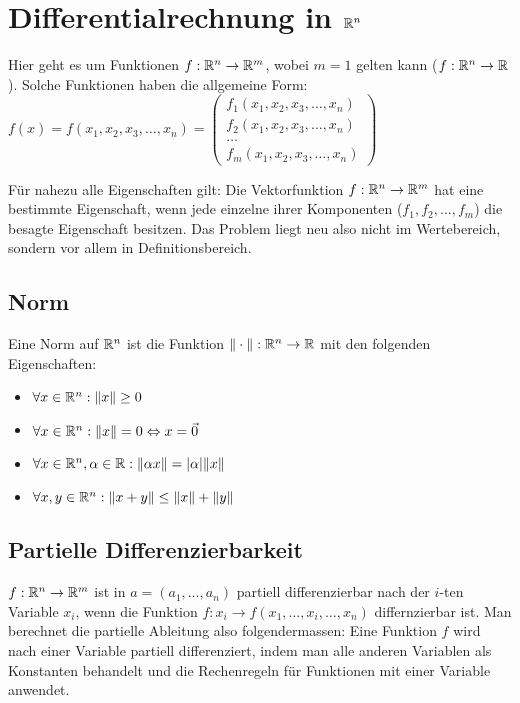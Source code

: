 \section{Differentialrechnung in $\mathbb{R}^n$}
Hier geht es um Funktionen $f: \mathbb{R}^n \to \mathbb{R}^m$, wobei $m=1$ gelten kann
($f: \mathbb{R}^n \to \mathbb{R}$). Solche Funktionen haben die allgemeine Form:
$f(x) = f(x_1, x_2, x_3, \ldots, x_n) = \begin{pmatrix}
f_1(x_1, x_2, x_3, \ldots, x_n)\\
f_2(x_1, x_2, x_3, \ldots, x_n)\\
\ldots\\
f_m(x_1, x_2, x_3, \ldots, x_n)
\end{pmatrix}$

Für nahezu alle Eigenschaften gilt: Die Vektorfunktion $f: \mathbb{R}^n \to \mathbb{R}^m$ hat
eine bestimmte Eigenschaft, wenn jede einzelne ihrer Komponenten
($f_1, f_2, \ldots, f_m$) die besagte Eigenschaft besitzen. Das Problem liegt
neu also nicht im Wertebereich, sondern vor allem in Definitionsbereich.

\subsection{Norm}
Eine Norm auf $\mathbb{R}^n$ ist die Funktion $\|\cdot\|: \mathbb{R}^n \to \mathbb{R}$ mit den folgenden
Eigenschaften:
\begin{itemize}
	\item $\forall x \in \mathbb{R}^n: \|x\| \geq 0$
	\item $\forall x \in \mathbb{R}^n: \|x\| = 0 \Leftrightarrow x = \vec{0}$
	\item $\forall x \in \mathbb{R}^n, \alpha \in \mathbb{R}: \|\alpha x\| = |\alpha| \|x\|$
	\item $\forall x,y \in \mathbb{R}^n: \|x + y\| \leq \|x\|+\|y\|$
\end{itemize}

\subsection{Partielle Differenzierbarkeit}
$f: \mathbb{R}^n \to \mathbb{R}^m$ ist in $a = (a_1, \ldots, a_n)$ partiell differenzierbar nach
der $i$-ten Variable $x_i$, wenn die Funktion
$f: x_i \to f(x_1, \ldots, x_i, \ldots, x_n)$ differnzierbar ist. Man berechnet
die partielle Ableitung also folgendermassen: Eine Funktion $f$ wird nach einer
Variable partiell differenziert, indem man alle anderen Variablen als Konstanten
behandelt und die Rechenregeln für Funktionen mit einer Variable anwendet.

